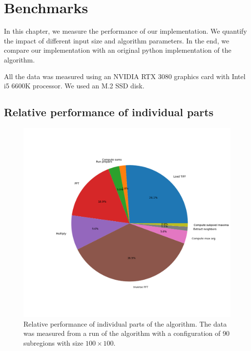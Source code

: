 \chapter{Benchmarks}

In this chapter, we measure the performance of our implementation. We quantify the impact of different input size and algorithm parameters. In the end, we compare our implementation with an original python implementation of the algorithm.

All the data was measured using an NVIDIA RTX 3080 graphics card with Intel i5 6600K processor. We used an M.2 SSD disk.


\section{Relative performance of individual parts}

\begin{figure}
	\centering
	\includegraphics[width=\textwidth]{img/eval/individual-parts}
	\caption{Relative performance of individual parts of the algorithm. The data was measured from a run of the algorithm with a configuration of 90 subregions with size $100 \times 100$.}
	\label{individual-parts}
\end{figure}

